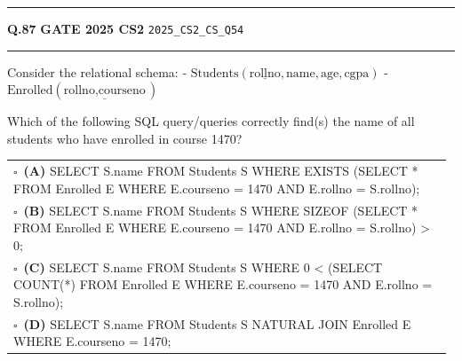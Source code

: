 \documentclass[a4paper,10pt]{article}
\begin{document}
\vspace{6pt}\hrule height 0.35pt\vspace{6pt}
\noindent
\begin{tcolorbox}[
    blanker,
    sidebyside,
    sidebyside align=top,
    lefthand width=0.55\textwidth,
    top=4pt, bottom=4pt, left=0pt, right=0pt,
    middle=16pt,
    underlay={
        \draw[dashed, black!80, line width=0.8pt, dash pattern=on 4pt off 3pt]
            ([xshift=0.55\textwidth+8pt]frame.north west) --
            ([xshift=0.55\textwidth+8pt]frame.south west);
    }
]
\textbf{Q.87}  \hfill {\footnotesize\textbf{GATE 2025 CS2} \quad \tiny\texttt{2025\_CS2\_CS\_Q54}}
\vspace{2pt}\hrule height 0.3pt\vspace{4pt}

Consider the relational schema:
- $\text{Students}(\underline{\text{rollno}}, \text{name}, \text{age}, \text{cgpa})$
- $\text{Enrolled}(\underline{\text{rollno}, \text{courseno}})$
\par\medskip
Which of the following SQL query/queries correctly find(s) the name of all students who have enrolled in course 1470?

\par\vspace{6pt}\noindent
\begin{tabular}{@{}p{0.98\linewidth}@{}}
$\square$\ \textbf{(A)} SELECT S.name \newline FROM Students S \newline WHERE EXISTS (SELECT * FROM Enrolled E WHERE E.courseno = 1470 AND E.rollno = S.rollno); \\
\addlinespace[3pt]
$\square$\ \textbf{(B)} SELECT S.name \newline FROM Students S \newline WHERE SIZEOF (SELECT * FROM Enrolled E WHERE E.courseno = 1470 AND E.rollno = S.rollno) > 0; \\
\addlinespace[3pt]
$\square$\ \textbf{(C)} SELECT S.name \newline FROM Students S \newline WHERE 0 < (SELECT COUNT(*) FROM Enrolled E WHERE E.courseno = 1470 AND E.rollno = S.rollno); \\
\addlinespace[3pt]
$\square$\ \textbf{(D)} SELECT S.name \newline FROM Students S NATURAL JOIN Enrolled E \newline WHERE E.courseno = 1470;
\end{tabular}


\end{tcolorbox}
\end{document}
